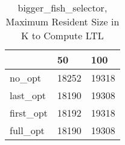 \begin{table}
\caption{bigger\_fish\_selector, Maximum Resident Size in K to Compute LTL}
\label{bigger_fish_selector_LTL_size}
\begin{tabular}{lll}
\toprule
 & 50 & 100 \\
\midrule
no\_opt & 18252 & 19318 \\
last\_opt & 18190 & 19308 \\
first\_opt & 18192 & 19318 \\
full\_opt & 18190 & 19308 \\
\bottomrule
\end{tabular}
\end{table}
